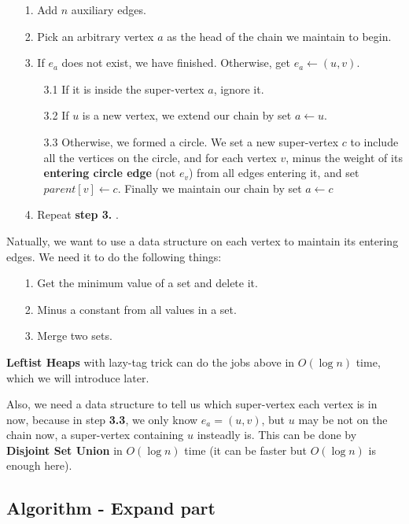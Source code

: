 \documentclass{article}
\begin{document}
\begin{itemize}
    \item [1.] Add $n$ auxiliary edges.
    \item [2.] Pick an arbitrary vertex $a$ as the head of the chain we maintain to begin.
    \item [3.] If $e_a$ does not exist, we have finished. Otherwise, get $e_a\leftarrow(u,v)$.
    \begin{itemize}
        \item [3.1] If it is inside the super-vertex $a$, ignore it.
        \item [3.2] If $u$ is a new vertex, we extend our chain by set $a\leftarrow u$.
        \item [3.3] Otherwise, we formed a circle. We set a new super-vertex $c$ to include all the vertices on the circle, and for each vertex $v$, minus the weight of its \textbf{entering circle edge} (not $e_v$) from all edges entering it, and set $parent[v]\leftarrow c$. Finally we maintain our chain by set $a\leftarrow c$
    \end{itemize}
    \item [4.] Repeat \textbf{step 3.} .
\end{itemize}

Natually, we want to use a data structure on each vertex to maintain its entering edges. We need it to do the following things:

\begin{itemize}
    \item [1.] Get the minimum value of a set and delete it.
    \item [2.] Minus a constant from all values in a set.
    \item [3.] Merge two sets.
\end{itemize}

\textbf{Leftist Heaps} with lazy-tag trick can do the jobs above in $O(\log n)$ time, which we will introduce later.

Also, we need a data structure to tell us which super-vertex each vertex is in now, because in step \textbf{3.3}, we only know $e_a=(u,v)$, but $u$ may be not on the chain now, a super-vertex containing $u$ insteadly is. This can be done by \textbf{Disjoint Set Union} in $O(\log n)$ time (it can be faster but $O(\log n)$ is enough here).

\subsection{Algorithm - Expand part}
\end{document}
